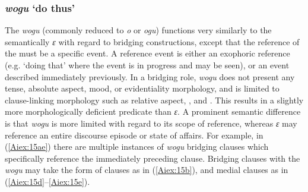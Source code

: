 \documentclass[output=paper]{LSP/langsci}
\begin{document}
\subsubsection{\textit{wogu} `do thus'} 
\label{Aidemonverb.wogu}
The  \textit{wogu} (commonly reduced to \textit{o} or \textit{ogu}) functions very similarly to the semantically  \textit{ɛ} with regard to bridging constructions, except that the reference of the  must be a specific event. A reference event is either an exophoric reference (e.g. `doing that' where the event is in progress and may be seen), or an event described immediately previously. In a bridging role, \textit{wogu} does not present any tense, absolute aspect, mood, or evidentiality morphology, and is limited to clause-linking morphology such as relative aspect, , and . This results in a slightly more morphologically deficient predicate than \textit{ɛ}. A prominent semantic difference is that \textit{wogu} is more limited with regard to its scope of reference, whereas \textit{ɛ} may reference an entire discourse episode or state of affairs. For example, in (\ref{Aiex:15ae}) there are multiple instances of \textit{wogu} bridging clauses which specifically reference the immediately preceding clause. Bridging clauses with the  \textit{wogu} may take the form of  clauses as in (\ref{Aiex:15b}), and medial clauses as in (\ref{Aiex:15d}--\ref{Aiex:15e}).
\end{document}
